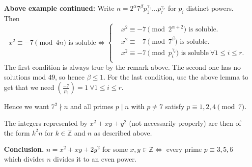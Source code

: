 \documentclass{article}
\theoremstyle{definition}
\begin{document}
\textbf{Above example continued:} Write $n = 2^{\alpha}7^{\beta}p_1^{\gamma_1}\ldots p_{r}^{\gamma_r}$ for $p_i$ distinct powers. Then
\[
x^2 \equiv -7 \pmod{4n} \text{ is soluble} \iff \begin{cases}
    &x^2 \equiv -7 \pmod{2^{\alpha+2}} \text{ is soluble.} \\
    &x^2 \equiv -7 \pmod{7^{\beta}} \text{ is soluble.} \\
    &x^2 \equiv -7 \pmod{p_i^{\gamma_i}} \text{ is soluble}~\forall 1\le i\le r. \\
\end{cases}
\]
The first condition is always true by the remark above. The second one has no solutions mod $49$, so hence $\beta\le 1$. For the last condition, use the above lemma to get that we need $\left(\frac{-7}{p_i} \right) = 1 ~\forall 1 \le i \le r$.
\vspace{1mm}

Hence we want $7^2 \nmid n$ and all primes $p \mid n$ with $p \neq 7$ satisfy $p \equiv 1,2,4 \pmod{7}$.
\vspace{1mm}

The integers represented by $x^2+xy+y^2$ (not necessarily properly) are then of the form $k^2n$ for $k \in \mathbb{Z}$ and $n$ as described above.
\vspace{1mm}

\textbf{Conclusion.} $n = x^2+xy+2y^2$ for some $x,y \in \mathbb{Z} \iff$ every prime $p \equiv 3,5,6$ which divides $n$ divides it to an even power.
\vspace{1mm}
\end{document}

